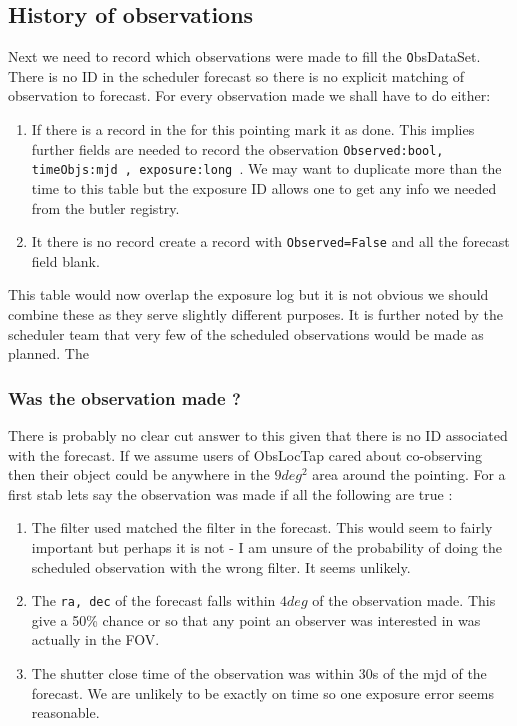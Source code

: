 \subsection{History of observations}
Next we need to record which observations were made to fill the {\texttt ObsDataSet}.
There is no ID in the scheduler forecast so there is no explicit matching of observation to forecast.
For every observation made we shall have to do either:
\begin{enumerate}
\item If there is a record in the \DB for this pointing mark it as done. This implies further fields are needed to record the observation {\tt Observed:bool, timeObjs:mjd , exposure:long }. We may want to duplicate more than the time to this table but the exposure ID allows one to get any info we needed from the butler registry.
\item It there is no record create a record with {\tt Observed=False} and all the forecast field blank.
\end{enumerate}

This table would now overlap the exposure log but it is not obvious we should combine these as they serve slightly different purposes.
It is further noted by the scheduler team that very few of the scheduled observations would be made as planned. The

\subsubsection{Was the  observation made ?}\label{sec:made}
There is probably no clear cut answer to this given that there is no ID associated with the forecast.
If we assume users of ObsLocTap cared about co-observing then their object could be anywhere in the
$9 deg^2$ area around the pointing.
For a first stab lets say the observation was made if all the following are true :

\begin{enumerate}
\item The filter used matched the filter in the forecast.
This would seem to fairly important but perhaps it is not - I am unsure of the probability of
doing the scheduled observation with the wrong filter. It seems unlikely.
\item The {\tt ra, dec} of the forecast falls within $4 deg$ of the observation made.
This give a 50\% chance or so that any point an observer was interested in was actually in the FOV.
\item The shutter close time of the observation was within 30s of the mjd of the forecast.
We are unlikely to be exactly on time so one exposure error seems reasonable.
\end{enumerate}

